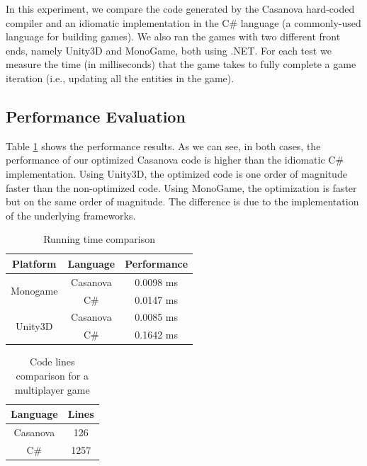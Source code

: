 In this experiment, we compare the code generated by the Casanova hard-coded compiler and an idiomatic implementation in the C\# language (a commonly-used language for building games). We also ran the games with two different front ends, namely Unity3D and MonoGame, both using .NET.
For each test we measure the time (in milliseconds) that the game takes to fully complete a game iteration (i.e., updating all the entities in the game).

\subsection{Performance Evaluation} Table \ref{tab:ch_networking_times} shows the performance results. As we can see, in both cases, the performance of our optimized Casanova code is higher than the idiomatic C\# implementation. Using Unity3D, the optimized code is one order of magnitude faster than the non-optimized code. Using MonoGame, the optimization is faster but on the same order of magnitude. The difference is due to the implementation of the underlying frameworks.

\begin{table}
\centering
\begin{tabular}{|c|c|c|}
\hline
 Platform & Language & Performance\\ \hline
\multirow{2}{*}{Monogame}
  & Casanova & 0.0098 ms\\
  & C\# & 0.0147 ms\\ \hline
\multirow{2}{*}{Unity3D}
  & Casanova & 0.0085 ms\\
  & C\# & 0.1642 ms\\ 
  \hline
\end{tabular}
\caption{Running time comparison}
\label{tab:ch_networking_times}
\end{table}

\begin{table}
\centering
\begin{tabular}{|c|c|}
	\hline
	Language & Lines \\ \hline
	Casanova & 126 \\
	\hline
	C\# &  1257 \\
	\hline
\end{tabular}
\caption{Code lines comparison for a multiplayer game}
\label{tab:ch_networking_length}
\end{table}

